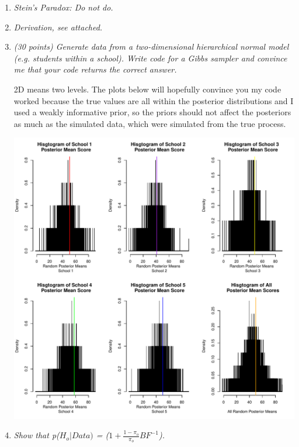 \documentclass{article}\usepackage[]{graphicx}\usepackage[]{color}
\makeatletter
\def\maxwidth{ %
  \ifdim\Gin@nat@width>\linewidth
    \linewidth
  \else
    \Gin@nat@width
  \fi
}
\newenvironment{knitrout}{}{} %
\makeatother
\begin{document}
\begin{enumerate}
\item%
{\it Stein's Paradox: Do not do.}


\item %
{\it Derivation, see attached.}

\item%
{\it (30 points) Generate data from a two-dimensional hierarchical normal model (e.g. students
within a school). Write code for a Gibbs sampler and convince me that your code returns the
correct answer.}

2D means two levels. The plots below will hopefully convince you my code worked because the true values are all within the posterior distributions and I used a weakly informative prior, so the priors should not affect the posteriors as much as the simulated data, which were simulated from the true process.

\begin{knitrout}
\color{fgcolor}
\includegraphics[width=\maxwidth]{figure/prob3-1} 

\end{knitrout}


\item%
{\it Show that p($H_{o} | Data )$ = ($ 1 + \frac{1-\pi_{o}}{\pi_{o}}BF^{-1}$).}


\end{enumerate}
\end{document}
